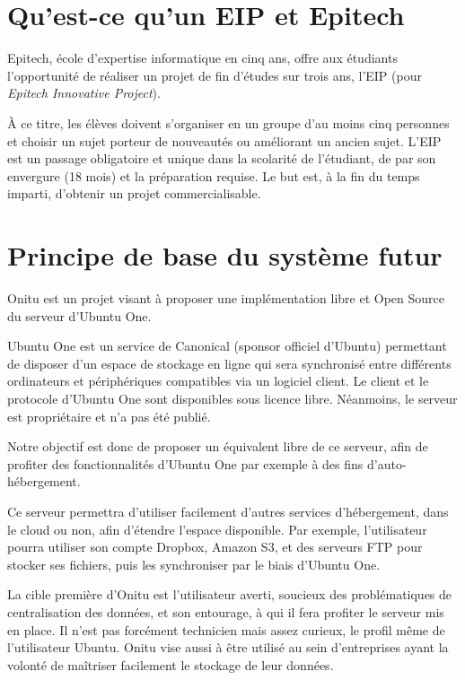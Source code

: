 \section{Qu'est-ce qu'un EIP et Epitech}
Epitech, école d'expertise informatique en cinq ans, offre aux étudiants l'opportunité de réaliser un projet de fin d'études sur trois ans, l'EIP (pour \emph{Epitech Innovative Project}).

À ce titre, les élèves doivent s'organiser en un groupe d'au moins cinq personnes et choisir un sujet porteur de nouveautés ou améliorant un ancien sujet. L'EIP est un passage obligatoire et unique dans la scolarité de l'étudiant, de par son envergure (18 mois) et la préparation requise. Le but est, à la fin du temps imparti, d'obtenir un projet commercialisable.


\section{Principe de base du système futur}
    Onitu est un projet visant à proposer une implémentation libre et Open Source du serveur d’Ubuntu One.

    Ubuntu One est un service de Canonical (sponsor officiel d'Ubuntu) permettant de disposer d’un espace de stockage en ligne qui sera synchronisé entre différents ordinateurs et périphériques compatibles via un logiciel client. Le client et le protocole d’Ubuntu One sont disponibles sous licence libre. Néanmoins, le serveur est propriétaire et n’a pas été publié.

    Notre objectif est donc de proposer un équivalent libre de ce serveur, afin
    de profiter des fonctionnalités d’Ubuntu One par exemple à des fins d’auto-hébergement.

    Ce serveur permettra d'utiliser facilement d'autres services d'hébergement, dans le cloud ou non, afin d'étendre l'espace disponible. Par exemple, l'utilisateur pourra utiliser son compte Dropbox, Amazon S3, et des serveurs FTP pour stocker ses fichiers, puis les synchroniser par le biais d'Ubuntu One.

    La cible première d'Onitu est l'utilisateur averti, soucieux des problématiques de centralisation des données, et son entourage, à qui il fera profiter le serveur mis en place. Il n'est pas forcément technicien mais assez curieux, le profil même de l'utilisateur Ubuntu.
    Onitu vise aussi à être utilisé au sein d'entreprises ayant la volonté de maîtriser facilement le stockage de leur données.
